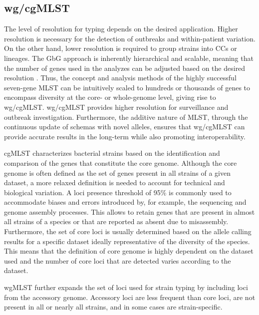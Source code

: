 \subsection{wg/cgMLST}

The level of resolution for typing depends on the desired application. Higher resolution is necessary for the detection of outbreaks and within-patient variation. On the other hand, lower resolution is required to group strains into \ac{CC}s or lineages. The \ac{GbG} approach is inherently hierarchical and scalable, meaning that the number of genes used in the analyzes can be adjusted based on the desired resolution \cite{maiden_mlst_2013}. Thus, the concept and analysis methods of the highly successful seven-gene \ac{MLST} can be intuitively scaled to hundreds or thousands of genes to encompass diversity at the core- or whole-genome level, giving rise to \ac{wg/cgMLST}. \ac{wg/cgMLST} provides higher resolution for surveillance and outbreak investigation. Furthermore, the additive nature of \ac{MLST}, through the continuous update of schemas with novel alleles, ensures that \ac{wg/cgMLST} can provide accurate results in the long-term while also promoting interoperability.

\ac{cgMLST} characterizes bacterial strains based on the identification and comparison of the genes that constitute the core genome. Although the core genome is often defined as the set of genes present in all strains of a given dataset, a more relaxed definition is needed to account for technical and biological variation. A loci presence threshold of 95\% is commonly used to accommodate biases and errors introduced by, for example, the sequencing and genome assembly processes. This allows to retain genes that are present in almost all strains of a species or that are reported as absent due to misassembly. Furthermore, the set of core loci is usually determined based on the allele calling results for a specific dataset ideally representative of the diversity of the species. This means that the definition of core genome is highly dependent on the dataset used and the number of core loci that are detected varies according to the dataset.

\ac{wgMLST} further expands the set of loci used for strain typing by including loci from the accessory genome. Accessory loci are less frequent than core loci, are not present in all or nearly all strains, and in some cases are strain-specific. 

